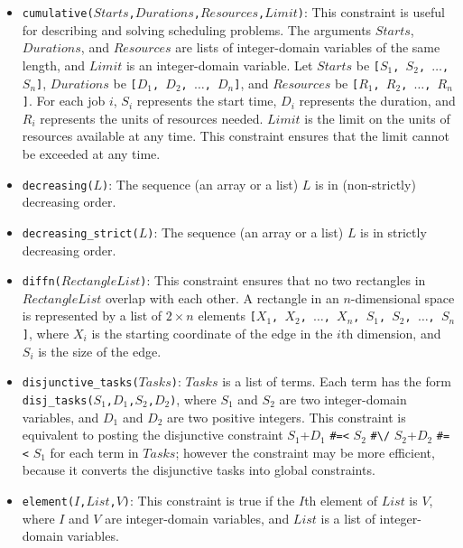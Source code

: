 \begin{itemize}
\item \texttt{cumulative($Starts$,$Durations$,$Resources$,$Limit$)}: This constraint is useful for describing and solving scheduling problems. The arguments $Starts$, $Durations$, and $Resources$ are lists of integer-domain variables of the same length, and $Limit$ is an integer-domain variable. Let $Starts$ be \texttt{[$S_1$, $S_2$, $\ldots$, $S_n$]}, $Durations$ be \texttt{[$D_1$, $D_2$, $\ldots$, $D_n$]}, and $Resources$ be \texttt{[$R_1$, $R_2$, $\ldots$, $R_n$]}. For each job \texttt{$i$}, \texttt{$S_i$} represents the start time, \texttt{$D_i$} represents the duration, and \texttt{$R_i$} represents the units of resources needed. $Limit$ is the limit on the units of resources available at any time. This constraint ensures that the limit cannot be exceeded at any time.

\item \texttt{decreasing($L$)}: The sequence (an array or a list) $L$ is in (non-strictly) decreasing order.

\item \texttt{decreasing\_strict($L$)}: The sequence (an array or a list) $L$ is in strictly decreasing order.

\item \texttt{diffn($RectangleList$)}: This constraint ensures that no two rectangles in $RectangleList$ overlap with each other. A rectangle in an $n$-dimensional space is represented by a list of $2\times n$ elements \texttt{[$X_1$, $X_2$, $\ldots$, $X_n$, $S_1$, $S_2$, $\ldots$, $S_n$]}, where \texttt{$X_i$} is the starting coordinate of the edge in the $i$th dimension, and \texttt{$S_i$} is the size of the edge.

\item \texttt{disjunctive\_tasks($Tasks$)}: $Tasks$ is a list of terms.  Each term has the form \\ \texttt{disj\_tasks($S_1$,$D_1$,$S_2$,$D_2$)}, where \texttt{$S_1$} and \texttt{$S_2$} are two integer-domain variables, and \texttt{$D_1$} and \texttt{$D_2$} are two positive integers. This constraint is equivalent to posting the disjunctive constraint $S_1$+$D_1$ \verb+#=<+ $S_2$ \verb+#\/+ $S_2$+$D_2$ \verb+#=<+ $S_1$ for each term in $Tasks$; however the constraint may be more efficient, because it converts the disjunctive tasks into global constraints. 

\item \texttt{element($I$,$List$,$V$)}: This constraint is true if the $I$th element of $List$ is $V$, where $I$ and $V$ are integer-domain variables, and $List$ is a list of integer-domain variables.


\end{itemize}
